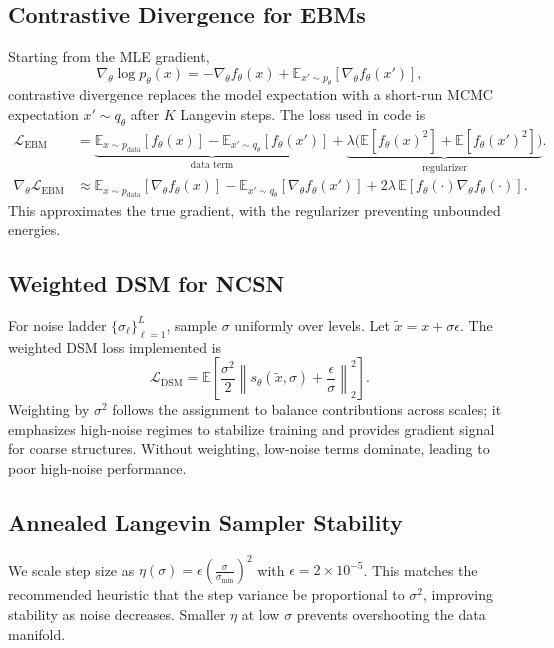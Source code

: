 \documentclass[a4paper,12pt]{article}
\begin{document}
\subsection{Contrastive Divergence for EBMs}
Starting from the MLE gradient,
\begin{equation}
    \nabla_\theta \log p_\theta(x) = -\nabla_\theta f_\theta(x) + \mathbb{E}_{x' \sim p_\theta}[\nabla_\theta f_\theta(x')],
\end{equation}
contrastive divergence replaces the model expectation with a short-run MCMC expectation $x' \sim q_\theta$ after $K$ Langevin steps. The loss used in code is
\begin{align}
    \mathcal{L}_{\text{EBM}} &= \underbrace{\mathbb{E}_{x \sim p_{\text{data}}}[f_\theta(x)] - \mathbb{E}_{x' \sim q_\theta}[f_\theta(x')]}_{\text{data term}} + \underbrace{\lambda \big( \mathbb{E}[f_\theta(x)^2] + \mathbb{E}[f_\theta(x')^2] \big)}_{\text{regularizer}}. \\
    \nabla_\theta \mathcal{L}_{\text{EBM}} &\approx \mathbb{E}_{x \sim p_{\text{data}}}[\nabla_\theta f_\theta(x)] - \mathbb{E}_{x' \sim q_\theta}[\nabla_\theta f_\theta(x')] + 2\lambda \, \mathbb{E}[f_\theta(\cdot)\nabla_\theta f_\theta(\cdot)].
\end{align}
This approximates the true gradient, with the regularizer preventing unbounded energies.

\subsection{Weighted DSM for NCSN}
For noise ladder $\{\sigma_\ell\}_{\ell=1}^L$, sample $\sigma$ uniformly over levels. Let $\tilde{x} = x + \sigma \epsilon$. The weighted DSM loss implemented is
\begin{equation}
    \mathcal{L}_{\text{DSM}} = \mathbb{E}\left[\frac{\sigma^2}{2} \left\| s_\theta(\tilde{x}, \sigma) + \frac{\epsilon}{\sigma} \right\|_2^2 \right].
\end{equation}
Weighting by $\sigma^2$ follows the assignment to balance contributions across scales; it emphasizes high-noise regimes to stabilize training and provides gradient signal for coarse structures. Without weighting, low-noise terms dominate, leading to poor high-noise performance.

\subsection{Annealed Langevin Sampler Stability}
We scale step size as $\eta(\sigma) = \epsilon \left(\frac{\sigma}{\sigma_{\min}}\right)^2$ with $\epsilon = 2\times 10^{-5}$. This matches the recommended heuristic that the step variance be proportional to $\sigma^2$, improving stability as noise decreases. Smaller $\eta$ at low $\sigma$ prevents overshooting the data manifold.
\end{document}
